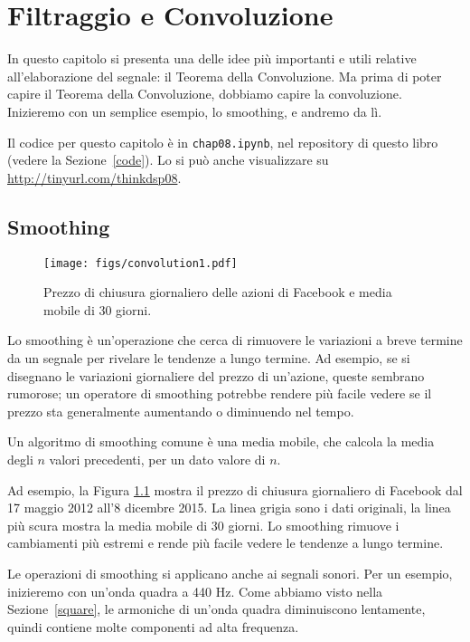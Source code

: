 \documentclass[12pt,a4paper]{book}
\begin{document}
\chapter{Filtraggio e Convoluzione} 

In questo capitolo si presenta una delle idee più importanti e utili relative all'elaborazione del segnale: il Teorema della Convoluzione. Ma prima di poter capire il Teorema della Convoluzione, dobbiamo capire la convoluzione. Inizieremo con un semplice esempio, lo smoothing, e andremo da lì.

Il codice per questo capitolo è in {\tt chap08.ipynb}, nel repository di questo libro (vedere la Sezione~\ref{code}). Lo si può anche visualizzare su \url{http://tinyurl.com/thinkdsp08}.

\section{Smoothing} \label{smoothing} 

\begin{figure} 

\centerline{\texttt{[image: figs/convolution1.pdf]}} \caption{Prezzo di chiusura giornaliero delle azioni di Facebook e media mobile di 30 giorni.} \label{fig.convolution1} \end{figure} 

Lo smoothing è un'operazione che cerca di rimuovere le variazioni a breve termine da un segnale per rivelare le tendenze a lungo termine. Ad esempio, se si disegnano le variazioni giornaliere del prezzo di un'azione, queste sembrano rumorose; un operatore di smoothing potrebbe rendere più facile vedere se il prezzo sta generalmente aumentando o diminuendo nel tempo.

Un algoritmo di smoothing comune è una media mobile, che calcola la media degli $n$ valori precedenti, per un dato valore di $n$.

Ad esempio, la Figura \ref{fig.convolution1} mostra il prezzo di chiusura giornaliero di Facebook dal 17 maggio 2012 all'8 dicembre 2015. La linea grigia sono i dati originali, la linea più scura mostra la media mobile di 30 giorni. Lo smoothing rimuove i cambiamenti più estremi e rende più facile vedere le tendenze a lungo termine.

Le operazioni di smoothing si applicano anche ai segnali sonori. Per un esempio, inizieremo con un'onda quadra a 440 Hz. Come abbiamo visto nella Sezione~\ref{square}, le armoniche di un'onda quadra diminuiscono lentamente, quindi contiene molte componenti ad alta frequenza.
\end{document}
